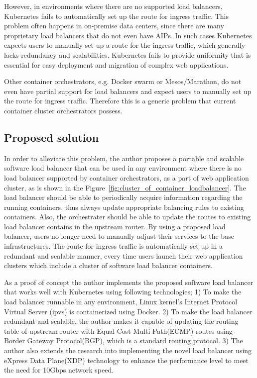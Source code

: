 However, in environments where there are no supported load balancers, Kubernetes fails to automatically set up the route for ingress traffic.
This problem often happens in on-premise data centers,  since there are many proprietary load balancers that do not even have AIPs.
In such cases Kubernetes expects users to manually set up a route for the ingress traffic, which generally lacks redundancy and scalabilities.
Kubernetes fails to provide uniformity that is essential for easy deployment and migration of complex web applications.

Other container orchestrators, e.g. Docker swarm or Mesos/Marathon, do not even have partial support for load balancers and expect users to manually set up the route for ingress traffic.
Therefore this is a generic problem that current container cluster orchestrators possess.

\subsection{Proposed solution}


In order to alleviate this problem, the author proposes a portable and scalable software load balancer that can be used in any environment where there is no load balancer supported by container orchestrators, as a part of web application cluster, as is shown in the Figure~\ref{fig:cluster_of_container_loadbalancer}.
The load balancer should be able to periodically acquire information regarding the running containers, thus always update appropriate balancing rules to existing containers.
Also, the orchestrater should be able to update the routes to existing load balancer contains in the upstream router.
By using a proposed load balancer, users no longer need to manually adjust their services to the base infrastructures.
The route for ingress traffic is automatically set up in a redundant and scalable manner, every time users launch their web application clusters which include a cluster of software load balancer containers.

As a proof of concept the author implements the proposed software load balancer that works well with Kubernetes using following technologies;
1) To make the load balancer runnable in any environment, Linux kernel's Internet Protocol Virtual Server (ipvs)\cite{Zhang2000} is containerized using Docker\cite{merkel2014docker}. 
2) To make the load balancer redundant and scalable, the author makes it capable of updating the routing table of upstream router with Equal Cost Multi-Path(ECMP) routes\cite{al2008scalable} using Border Gateway Protocol(BGP), which is a standard routing protocol.
3) The author also extends the research into implementing the novel load balancer using eXpress Data Plane(XDP) technology\cite{bertin2017xdp} to enhance the performance level to meet the need for 10Gbps network speed.

